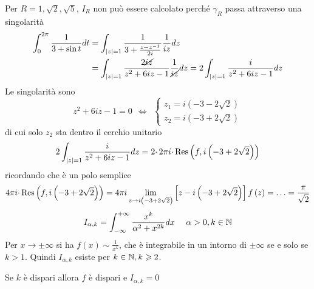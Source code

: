 Per $R=1,\sqrt{2} ,\sqrt{5}$, $I_{R}$ non può essere calcolato perché $\gamma _{R}$ passa attraverso una singolarità
\Soluzione
\begin{align*}
\int ^{2\pi }_{0}\frac{1}{3+\sin t} dt & =\int _{\left| z\right| =1}\frac{1}{3+\frac{z-z^{-1}}{2i}}\frac{1}{iz} dz\\
 & =\int _{\left| z\right| =1}\frac{2\cancel{iz}}{z^{2} +6iz-1}\frac{1}{\cancel{iz}} dz=2\int _{\left| z\right| =1}\frac{i}{z^{2} +6iz-1} dz
\end{align*}
Le singolarità sono
\begin{equation*}
z^{2} +6iz-1=0\ \ \iff \ \ \begin{cases}
z_{1} =i\left( -3-2\sqrt{2}\right)\\
z_{2} =i\left( -3+2\sqrt{2}\right)
\end{cases}
\end{equation*}
di cui solo $z_{2}$ sta dentro il cerchio unitario
\begin{equation*}
2\int _{\left| z\right| =1}\frac{i}{z^{2} +6iz-1} dz=2\cdotp 2\pi i\cdotp \operatorname{Res} \left( f,i\left( -3+2\sqrt{2}\right)\right)
\end{equation*}
ricordando che è un polo semplice
\begin{equation*}
4\pi i\cdotp \operatorname{Res} \left( f,i\left( -3+2\sqrt{2}\right)\right) =4\pi i\lim\limits _{z\rightarrow i\left( -3+2\sqrt{2}\right)}\left[ z-i\left( -3+2\sqrt{2}\right)\right] f\left( z\right) =\dotsc =\frac{\pi }{\sqrt{2}}
\end{equation*}
\Soluzione
\begin{equation*}
I_{\alpha ,k} =\int ^{+\infty }_{-\infty }\frac{x^{k}}{\alpha ^{2} +x^{2k}} dx\ \ \ \ \alpha  >0,k\in \mathbb{N} 
\end{equation*}
Per $x\rightarrow \pm \infty $ si ha $f\left( x\right) \sim \frac{1}{x^{k}}$, che è integrabile in un intorno di $\pm \infty $ se e solo se $k >1$. Quindi $I_{\alpha ,k}$ esiste per $k\in \mathbb{N}  ,k\geqslant 2$.

Se $k$ è dispari allora $f$ è dispari e $I_{\alpha ,k} =0$

